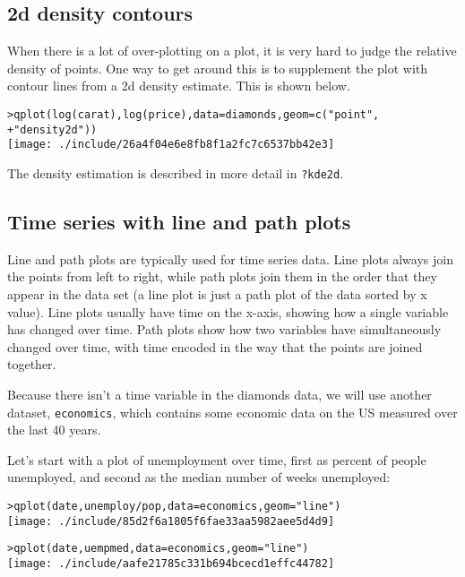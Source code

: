 \subsection{2d density contours}

When there is a lot of over-plotting on a plot, it is very hard to judge the relative density of points.  One way to get around this is to supplement the plot with contour lines from a 2d density estimate.  This is shown below.

\begin{alltt}
> qplot(log(carat), log(price), data = diamonds, geom = c("point", 
+     "density2d"))
\texttt{[image: ./include/26a4f04e6e8fb8f1a2fc7c6537bb42e3]}

\end{alltt}

The density estimation is described in more detail in {\tt ?kde2d}.

\subsection{Time series with line and path plots}\label{sub:line_plot}

Line and path plots are typically used for time series data.  Line plots always join the points from left to right, while path plots join them in the order that they appear in the data set (a line plot is just a path plot of the data sorted by x value).  Line plots usually have time on the x-axis, showing how a single variable has changed over time.  Path plots show how two variables have simultaneously changed over time, with time encoded in the way that the points are joined together.

Because there isn't a time variable in the diamonds data, we will use another dataset, {\tt economics}, which contains some economic data on the US measured over the last 40 years.

Let's start with a plot of unemployment over time, first as percent of people unemployed, and second as the median number of weeks unemployed:

\begin{alltt}
> qplot(date, unemploy/pop, data = economics, geom = "line")
\texttt{[image: ./include/85d2f6a1805f6fae33aa5982aee5d4d9]}

> qplot(date, uempmed, data = economics, geom = "line")
\texttt{[image: ./include/aafe21785c331b694bcecd1effc44782]}

\end{alltt}

